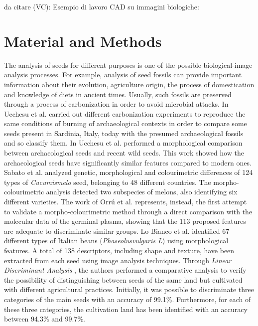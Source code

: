 \documentclass{svjour3}                     %
\begin{document}
da citare (VC): \cite{Junos2021} \cite{Gajjar2021} \cite{Zhang2019} 
Esempio di lavoro CAD su immagini biologiche: \cite{Ahmad2021}


\section{Material and Methods}
The analysis of seeds for different purposes is one of the possible biological-image analysis processes. For example, analysis of seed fossils can provide important information about their evolution, agriculture origin, the process of domestication and knowledge of diets in ancient times. Usually, such fossils are preserved through a process of carbonization in order to avoid microbial attacks.
In \cite{Ucc2016} Ucchesu et al. carried out different carbonization experiments to reproduce the same conditions of burning of archaeological contexts in order to compare some seeds present in Sardinia, Italy, today with the presumed archaeological fossils and so classify them.
In \cite{Ucc2015} Ucchesu et al. performed a morphological comparison between archaeological seeds and recent wild seeds. This work showed how the archaeological seeds have significantly similar features compared to modern ones. Sabato et al. \cite{Sabato2015} analyzed genetic, morphological and colourimetric differences of 124 types of \emph{Cucumismelo} seed, belonging to 48 different countries. The morpho-colourimetric analysis detected two subspecies of melons, also identifying six different varieties. The work of Orr\'u et al. \cite{Orru2012} represents, instead, the first attempt to validate a morpho-colourimetric method through a direct comparison with the molecular data of the germinal plasma, showing that the 113 proposed features are adequate to discriminate similar groups. Lo Bianco et al. \cite{LoBianco2015} identified 67 different types of Italian beans (\emph{Phaseolusvulgaris L}) using morphological features. A total of 138 descriptors, including shape and texture, have been extracted from each seed using image analysis techniques. Through \emph{Linear Discriminant Analysis} \cite{Gonz_2018}, the authors performed a comparative analysis to verify the possibility of distinguishing between seeds of the same land but cultivated with different agricultural practices. Initially, it was possible to discriminate three categories of the main seeds with an accuracy of 99.1\%. Furthermore, for each of these three categories, the cultivation land has been identified with an accuracy between 94.3\% and 99.7\%.
\end{document}
